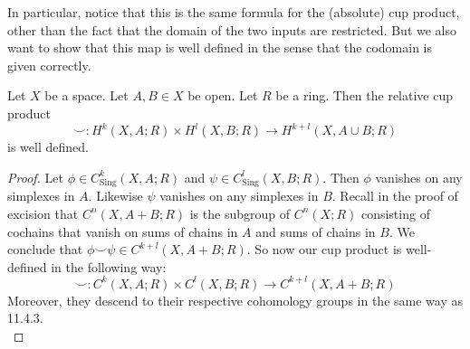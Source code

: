 \documentclass[a4paper]{article}
\begin{document}
In particular, notice that this is the same formula for the (absolute) cup product, other than the fact that the domain of the two inputs are restricted. But we also want to show that this map is well defined in the sense that the codomain is given correctly. 

\begin{lmm}{}{} Let $X$ be a space. Let $A,B\in X$ be open. Let $R$ be a ring. Then the relative cup product $$\smile:H^k(X,A;R)\times H^l(X,B;R)\to H^{k+l}(X,A\cup B;R)$$ is well defined. 
\begin{proof}
Let $\phi\in C_\text{Sing}^k(X,A;R)$ and $\psi\in C_\text{Sing}^l(X,B;R)$. Then $\phi$ vanishes on any simplexes in $A$. Likewise $\psi$ vanishes on any simplexes in $B$. Recall in the proof of excision that $C^n(X,A+B;R)$ is the subgroup of $C^n(X;R)$ consisting of cochains that vanish on sums of chains in $A$ and sums of chains in $B$. We conclude that $\phi\smile\psi\in C^{k+l}(X,A+B;R)$. So now our cup product is well-defined in the following way: $$\smile:C^k(X,A;R)\times C^l(X,B;R)\to C^{k+l}(X,A+B;R)$$ Moreover, they descend to their respective cohomology groups in the same way as 11.4.3. \\


\end{proof}
\end{lmm}
\end{document}
